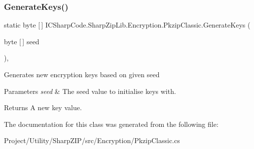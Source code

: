 \subsubsection{\texorpdfstring{Generate\+Keys()}{GenerateKeys()}\hspace{0.1cm}{\footnotesize\ttfamily [2/2]}}
{\footnotesize\ttfamily static byte \mbox{[}$\,$\mbox{]} I\+C\+Sharp\+Code.\+Sharp\+Zip\+Lib.\+Encryption.\+Pkzip\+Classic.\+Generate\+Keys (\begin{DoxyParamCaption}\item[{byte \mbox{[}$\,$\mbox{]}}]{seed }\end{DoxyParamCaption})\hspace{0.3cm}{\ttfamily [inline]}, {\ttfamily [static]}}



Generates new encryption keys based on given seed 


\begin{DoxyParams}{Parameters}
{\em seed} & The seed value to initialise keys with.\\
\hline
\end{DoxyParams}
\begin{DoxyReturn}{Returns}
A new key value.
\end{DoxyReturn}


The documentation for this class was generated from the following file\+:\begin{DoxyCompactItemize}
\item 
Project/\+Utility/\+Sharp\+Z\+I\+P/src/\+Encryption/Pkzip\+Classic.\+cs\end{DoxyCompactItemize}
